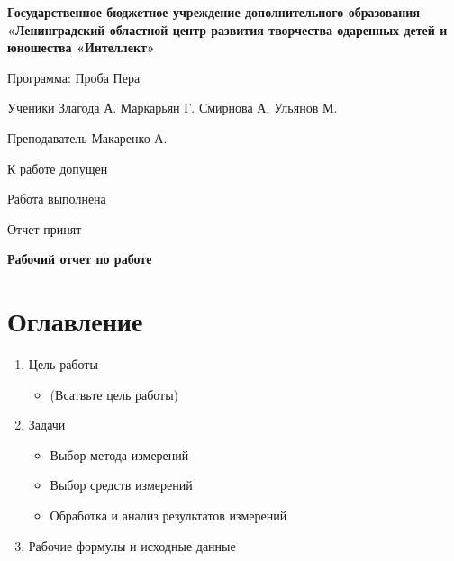 \documentclass[a4paper,11pt]{article}
\begin{document}
\begin{center}
    \bf
    Государственное бюджетное учреждение дополнительного образования «Ленинградский областной центр развития творчества одаренных детей и юношества «Интеллект»
\end{center}
\begin{multicols}{2}
Программа: Проба Пера

Ученики Злагода А. Маркарьян Г. \newline
        Смирнова А. Ульянов М.

Преподаватель Макаренко А.

К работе допущен

Работа выполнена


Отчет принят
\end{multicols}
\renewcommand{\thesection}{\Alph{section}}

\noindent\makebox[\linewidth]{\rule{\textwidth}{2pt}}

\begin{center}
    \textbf{\huge Рабочий отчет по работе  \normalsize}
    
\end{center}
\section{Оглавление}
\begin{enumerate}
	\item Цель работы
	\begin{itemize}
        \item (Всатвьте цель работы)
    \end{itemize}


	\item Задачи
	\begin{itemize}
		\item Выбор метода измерений
		\item Выбор средств измерений
		\item Обработка и анализ результатов измерений
	\end{itemize}
	
	
	\item Рабочие формулы и исходные данные
	
    
    \end{enumerate}
    

    
    
\newpage
\end{document}
